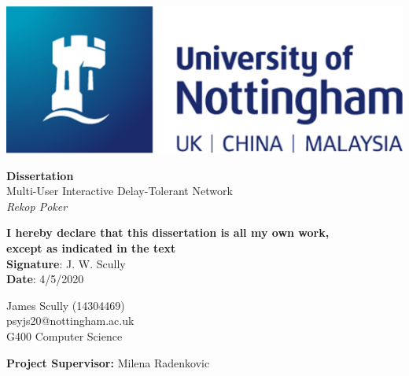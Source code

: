 \documentclass[11pt]{article}
\begin{document}
\begin{center}
	\includegraphics[scale=0.4]{uni_logo}
	
	\vspace{1cm}
	
	{\Large \textbf{Dissertation\\} 
		\vspace{16pt}
		Multi-User Interactive Delay-Tolerant Network\\
		\vspace{16pt}
		\textit{Rekop Poker}} 		
		\linebreak
		
	\textbf{I hereby declare that this dissertation is all my own work, \\except as indicated in the text} \\
	\vspace{8pt}
	\textbf{Signature}: J. W. Scully \\
	\textbf{Date}: 4/5/2020 \linebreak
		
	\begin{large}
		James Scully (14304469) \\
		psyjs20@nottingham.ac.uk \\
		G400 Computer Science \linebreak \\ 
	\end{large}
	
\end{center}

\vfill

\begin{center}
	\textbf{Project Supervisor:} Milena Radenkovic
\end{center}

\hspace{0pt}

\pagebreak


\newcommand{\entry}[1]{
	\textbf{#1} - 
}

\newcommand{\TODO}[1]{
	\textbf{{\Large \emph{#1}}}
}
\end{document}
